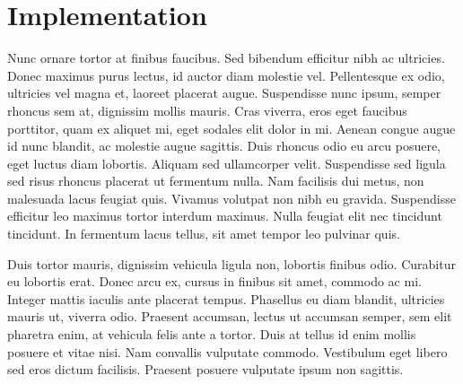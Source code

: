 \section{Implementation}
\label{sec:implementation}
Nunc ornare tortor at finibus faucibus. Sed bibendum efficitur nibh ac ultricies. Donec maximus purus lectus, id auctor diam molestie vel. Pellentesque ex odio, ultricies vel magna et, laoreet placerat augue. Suspendisse nunc ipsum, semper rhoncus sem at, dignissim mollis mauris. Cras viverra, eros eget faucibus porttitor, quam ex aliquet mi, eget sodales elit dolor in mi. Aenean congue augue id nunc blandit, ac molestie augue sagittis. Duis rhoncus odio eu arcu posuere, eget luctus diam lobortis. Aliquam sed ullamcorper velit. Suspendisse sed ligula sed risus rhoncus placerat ut fermentum nulla. Nam facilisis dui metus, non malesuada lacus feugiat quis. Vivamus volutpat non nibh eu gravida. Suspendisse efficitur leo maximus tortor interdum maximus. Nulla feugiat elit nec tincidunt tincidunt. In fermentum lacus tellus, sit amet tempor leo pulvinar quis.

Duis tortor mauris, dignissim vehicula ligula non, lobortis finibus odio. Curabitur eu lobortis erat. Donec arcu ex, cursus in finibus sit amet, commodo ac mi. Integer mattis iaculis ante placerat tempus. Phasellus eu diam blandit, ultricies mauris ut, viverra odio. Praesent accumsan, lectus ut accumsan semper, sem elit pharetra enim, at vehicula felis ante a tortor. Duis at tellus id enim mollis posuere et vitae nisi. Nam convallis vulputate commodo. Vestibulum eget libero sed eros dictum facilisis. Praesent posuere vulputate ipsum non sagittis. 